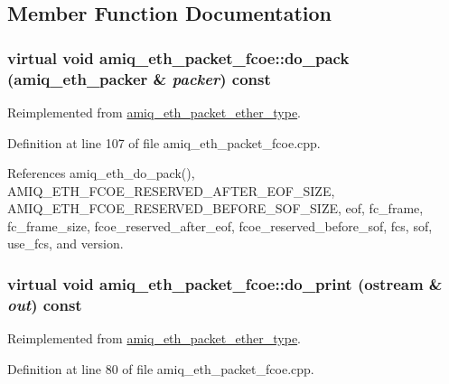 \subsection{Member Function Documentation}
\hypertarget{classamiq__eth__packet__fcoe_ae119ce0a219ea22eef14da61262afbb7}{
\subsubsection[{do\_\-pack}]{\setlength{\rightskip}{0pt plus 5cm}virtual void amiq\_\-eth\_\-packet\_\-fcoe::do\_\-pack ({\bf amiq\_\-eth\_\-packer} \& {\em packer}) const}}
\label{classamiq__eth__packet__fcoe_ae119ce0a219ea22eef14da61262afbb7}


Reimplemented from \hyperlink{classamiq__eth__packet__ether__type_a62fe5f26a466f0bd0045599b89aa6926}{amiq\_\-eth\_\-packet\_\-ether\_\-type}.

Definition at line 107 of file amiq\_\-eth\_\-packet\_\-fcoe.cpp.

References amiq\_\-eth\_\-do\_\-pack(), AMIQ\_\-ETH\_\-FCOE\_\-RESERVED\_\-AFTER\_\-EOF\_\-SIZE, AMIQ\_\-ETH\_\-FCOE\_\-RESERVED\_\-BEFORE\_\-SOF\_\-SIZE, eof, fc\_\-frame, fc\_\-frame\_\-size, fcoe\_\-reserved\_\-after\_\-eof, fcoe\_\-reserved\_\-before\_\-sof, fcs, sof, use\_\-fcs, and version.\hypertarget{classamiq__eth__packet__fcoe_a39fa215f83aa71ff06c5fd699de8e427}{
\subsubsection[{do\_\-print}]{\setlength{\rightskip}{0pt plus 5cm}virtual void amiq\_\-eth\_\-packet\_\-fcoe::do\_\-print (ostream \& {\em out}) const}}
\label{classamiq__eth__packet__fcoe_a39fa215f83aa71ff06c5fd699de8e427}


Reimplemented from \hyperlink{classamiq__eth__packet__ether__type_a9b2852fa1aaf278138fde2232e446f63}{amiq\_\-eth\_\-packet\_\-ether\_\-type}.

Definition at line 80 of file amiq\_\-eth\_\-packet\_\-fcoe.cpp.

